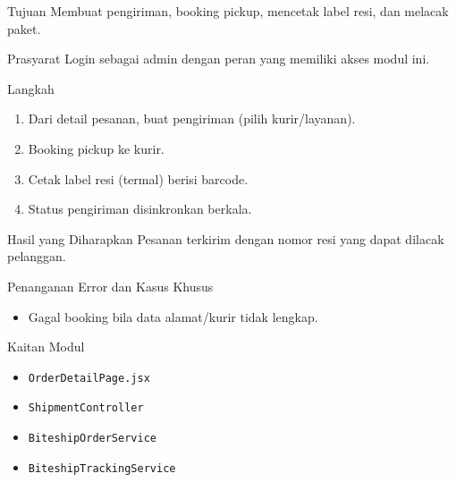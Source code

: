 
\begin{flowsection}{Tujuan}
Membuat pengiriman, booking pickup, mencetak label resi, dan melacak paket.
\end{flowsection}

\begin{flowsection}{Prasyarat}
Login sebagai admin dengan peran yang memiliki akses modul ini.
\end{flowsection}

\begin{flowsection}{Langkah}
\begin{enumerate}
  \item Dari detail pesanan, buat pengiriman (pilih kurir/layanan).
  \item Booking pickup ke kurir.
  \item Cetak label resi (termal) berisi barcode.
  \item Status pengiriman disinkronkan berkala.
\end{enumerate}
\end{flowsection}


\begin{flowsection}{Hasil yang Diharapkan}
Pesanan terkirim dengan nomor resi yang dapat dilacak pelanggan.
\end{flowsection}

\begin{flowsection}{Penanganan Error dan Kasus Khusus}
\begin{itemize}
  \item Gagal booking bila data alamat/kurir tidak lengkap.
\end{itemize}
\end{flowsection}

\begin{flowsection}{Kaitan Modul}
\begin{itemize}
  \item \texttt{OrderDetailPage.jsx}
  \item \texttt{ShipmentController}
  \item \texttt{BiteshipOrderService}
  \item \texttt{BiteshipTrackingService}
\end{itemize}
\end{flowsection}

